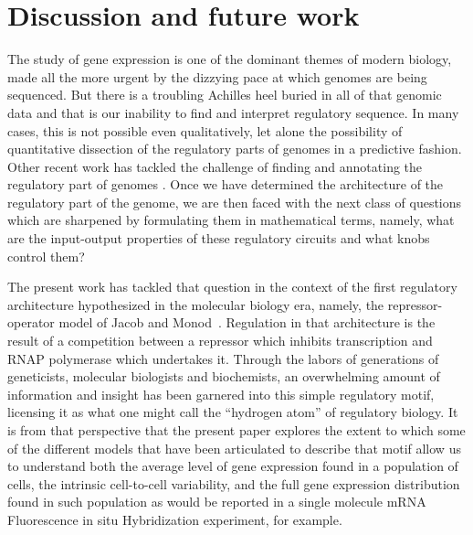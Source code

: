 \section{Discussion and future work}

The study of gene expression is one of the dominant themes of modern biology,
made all the more urgent by the dizzying pace at which genomes are being
sequenced. But there is a troubling Achilles heel buried in all of that genomic
data and that is our inability to find and interpret regulatory sequence. In
many cases, this is not possible even qualitatively, let alone the possibility
of quantitative dissection of the regulatory parts of genomes in a predictive
fashion. Other recent work has tackled the challenge of finding and annotating
the regulatory part of genomes \cite{Belliveau2018, Ireland2020}. Once we have
determined the architecture of the regulatory part of the genome, we are then
faced with the next class of questions which are sharpened by formulating them
in mathematical terms, namely, what are the input-output properties of these
regulatory circuits and what knobs control them?

The present work has tackled that question in the context of the first
regulatory architecture hypothesized in the molecular biology era, namely, the
repressor-operator model of Jacob and Monod~\cite{Jacob1961}. Regulation in that
architecture is the result of a competition between a repressor which inhibits
transcription and RNAP polymerase which undertakes it. Through the labors of
generations of geneticists, molecular biologists and biochemists, an
overwhelming amount of information and insight has been garnered into this
simple regulatory motif, licensing it as what one might call the ``hydrogen
atom'' of regulatory biology. It is from that perspective that the present paper
explores the extent to which some of the different models that have been
articulated to describe that motif allow us to understand both the average level
of gene expression found in a population of cells, the intrinsic cell-to-cell
variability, and the full gene expression distribution found in such population
as would be reported in a single molecule mRNA Fluorescence in situ
Hybridization experiment, for example.

